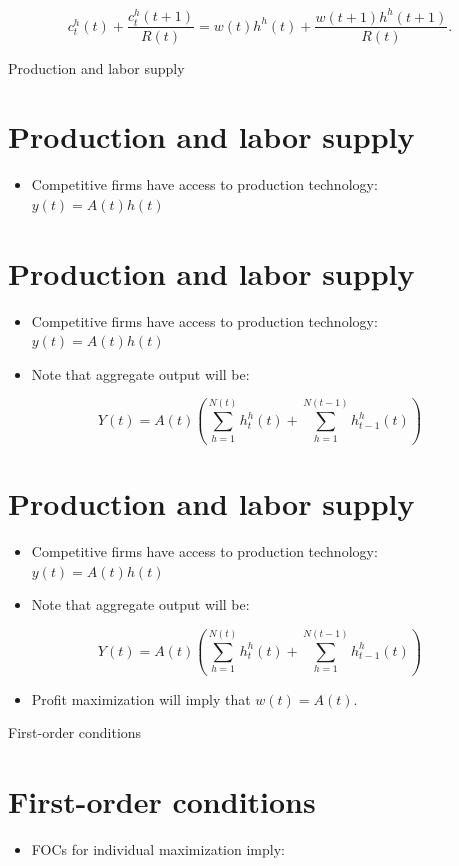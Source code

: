 \documentclass[10pt]{article}
\begin{document}
$$
c_{t}^{h}(t)+\frac{c_{t}^{h}(t+1)}{R(t)}=w(t) h^{h}(t)+\frac{w(t+1) h^{h}(t+1)}{R(t)} .
$$

Production and labor supply

\section*{Production and labor supply}
\begin{itemize}
  \item Competitive firms have access to production technology: $y(t)=A(t) h(t)$
\end{itemize}

\section*{Production and labor supply}
\begin{itemize}
  \item Competitive firms have access to production technology: $y(t)=A(t) h(t)$
  \item Note that aggregate output will be:
\end{itemize}

$$
Y(t)=A(t)\left(\sum_{h=1}^{N(t)} h_{t}^{h}(t)+\sum_{h=1}^{N(t-1)} h_{t-1}^{h}(t)\right)
$$

\section*{Production and labor supply}
\begin{itemize}
  \item Competitive firms have access to production technology: $y(t)=A(t) h(t)$
  \item Note that aggregate output will be:
\end{itemize}

$$
Y(t)=A(t)\left(\sum_{h=1}^{N(t)} h_{t}^{h}(t)+\sum_{h=1}^{N(t-1)} h_{t-1}^{h}(t)\right)
$$

\begin{itemize}
  \item Profit maximization will imply that $w(t)=A(t)$.
\end{itemize}

First-order conditions

\section*{First-order conditions}
\begin{itemize}
  \item FOCs for individual maximization imply:
\end{itemize}
\end{document}
